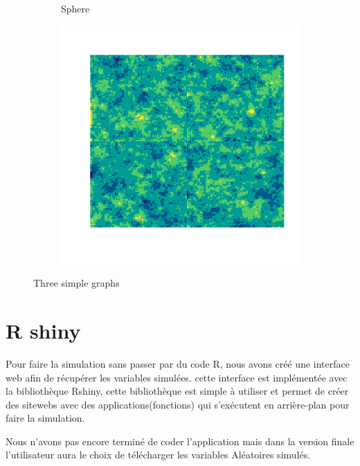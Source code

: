 \documentclass[10pt]{article} %
\begin{document}
\begin{figure}[h!]
\begin{subfigure}[b]{0.3\textwidth}
        \caption{Sphere}
        \label{fig:three sin x}
    \end{subfigure}
    \hfill
    \begin{subfigure}[b]{0.3\textwidth}
        \centering
        \includegraphics[width=\textwidth]{media/exp_2.png}
        \caption{}
        \label{fig:five over x}
    \end{subfigure}
       \caption{Three simple graphs}
       \label{fig:three graphs}
\end{figure}


\section{R shiny}

Pour faire la simulation sans passer par du code R, nous avons créé une interface web afin de récupérer les variables simulées.
cette interface est implémentée avec la bibliothèque Rshiny, cette bibliothèque est simple à utiliser et permet de créer des sitewebs
avec des applications(fonctions) qui s'exécutent en arrière-plan pour faire la simulation.

Nous n'avons pas encore terminé de coder l'application mais dans la version finale l'utilisateur aura le choix de télécharger les variables
Aléatoires simulés.
\end{document}
